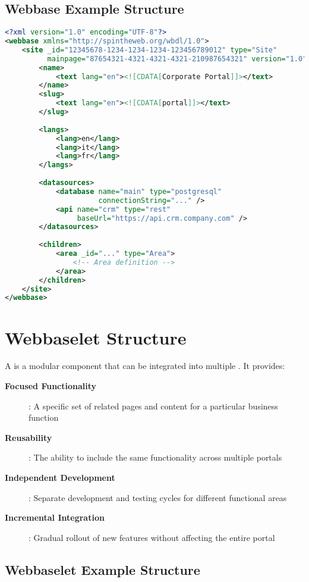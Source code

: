 \subsection{Webbase Example Structure}

\begin{lstlisting}[language=XML,caption={Basic Webbase Structure}]
<?xml version="1.0" encoding="UTF-8"?>
<webbase xmlns="http://spintheweb.org/wbdl/1.0">
	<site _id="12345678-1234-1234-1234-123456789012" type="Site" 
		  mainpage="87654321-4321-4321-4321-210987654321" version="1.0">
		<name>
			<text lang="en"><![CDATA[Corporate Portal]]></text>
		</name>
		<slug>
			<text lang="en"><![CDATA[portal]]></text>
		</slug>
        
		<langs>
			<lang>en</lang>
			<lang>it</lang>
			<lang>fr</lang>
		</langs>
        
		<datasources>
			<database name="main" type="postgresql" 
					  connectionString="..." />
			<api name="crm" type="rest" 
				 baseUrl="https://api.crm.company.com" />
		</datasources>
        
		<children>
			<area _id="..." type="Area">
				<!-- Area definition -->
			</area>
		</children>
	</site>
</webbase>
\end{lstlisting}

\section{Webbaselet Structure}
\label{sec:webbaselet-structure}

A \webbaselet{} is a modular component that can be integrated into multiple . It provides:

\begin{description}
\item[\textbf{Focused Functionality}]: A specific set of related pages and content for a particular business function
\item[\textbf{Reusability}]: The ability to include the same functionality across multiple portals
\item[\textbf{Independent Development}]: Separate development and testing cycles for different functional areas
\item[\textbf{Incremental Integration}]: Gradual rollout of new features without affecting the entire portal
\end{description}

\subsection{Webbaselet Example Structure}

